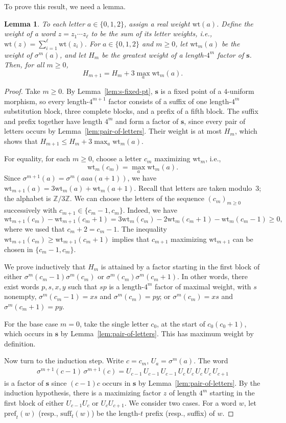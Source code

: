 \documentclass[12pt]{article}
\theoremstyle{plain}
\newtheorem{lemma}[theorem]{Lemma}
\theoremstyle{definition}
\theoremstyle{remark}
\newcommand{\Z}{\mathbb{Z}}
\numberwithin{equation}{section}
\newcommand{\weight}{\mathrm{wt}}
\newcommand{\pref}{\mathrm{pref}}
\newcommand{\suff}{\mathrm{suff}}
\begin{document}
To prove this result, we need a lemma.
\begin{lemma}\label{lem:extrema}
To each letter $a\in\{0,1,2\}$, assign a real weight $\weight(a)$.
Define the weight of a word $z=z_1 \cdots z_\ell$ to be the sum of its letter weights, i.e., $\weight(z) = \sum_{i=1}^\ell \weight(z_i)$.
For $a\in\{0,1,2\}$ and $m\ge 0$, let $\weight_m(a)$ be the weight of $\sigma^m(a)$, and let $H_m$
be the greatest weight of a length-$4^m$ factor of $\mathbf{s}$.
Then, for all $m\ge 0$, 
\[
 H_{m+1}=H_m+3\max_a \weight_m(a).
\]
\end{lemma}
\begin{proof}
Take $m\ge 0$. By Lemma~\ref{lem:s-fixed-pt}, $\mathbf{s}$ is a fixed point of a $4$-uniform morphism, so every length-$4^{m+1}$ factor consists of a suffix
of one length-$4^m$ substitution block, three complete blocks,
and a prefix of a fifth block. The suffix and prefix together
have length $4^m$ and form a factor of $\mathbf{s}$, since every pair of letters occurs by Lemma~\ref{lem:pair-of-letters}.
Their weight is at most $H_m$, which shows that $H_{m+1}\le H_m+3\max_a \weight_m(a)$.

For equality, for each $m\ge 0$, choose a letter $c_m$ maximizing $\weight_m$, i.e., $$\weight_m(c_m) = \max_a \weight_m(a).$$
Since $\sigma^{m+1}(a)=\sigma^m(aaa(a+1))$, we have $\weight_{m+1}(a)=3\weight_m(a)+\weight_m(a+1)$. Recall that letters are taken modulo~$3$; the alphabet is $\Z/3\Z$. We can choose the
letters of the sequence $(c_m)_{m\ge 0}$ successively with $c_{m+1}\in\{c_m-1,c_m\}$. Indeed, we have 
\[
 \weight_{m+1}(c_m)-\weight_{m+1}(c_m+1)
 =3\weight_m(c_m)-2\weight_m(c_m+1)-\weight_m(c_m-1)\ge0,
\]
where we used that $c_m+2=c_m-1$. The inequality $\weight_{m+1}(c_m)\ge \weight_{m+1}(c_m+1)$ implies that $c_{m+1}$ maximizing $\weight_{m+1}$ can be chosen in $\{c_m-1,c_m\}$.

We prove inductively that $H_m$ is attained by a factor
starting in the first block of either
$\sigma^m(c_m-1)\sigma^m(c_m)$ or
$\sigma^m(c_m)\sigma^m(c_m+1)$. In other words, there exist words $p,s,x,y$ such that $sp$ is a length-$4^m$ factor of maximal weight,  with $s$ nonempty, $\sigma^m(c_m-1)=xs$ and $\sigma^m(c_m)=py$; or $\sigma^m(c_m)=xs$ and $\sigma^m(c_m+1)=py$.

For the base case $m=0$, take the single letter $c_0$, at the start of $c_0(c_0+1)$, which occurs in $\mathbf{s}$ by Lemma~\ref{lem:pair-of-letters}. This has maximum weight by definition.

Now turn to the induction step.
Write $c=c_m$, $U_a=\sigma^m(a)$.
The word
\begin{align}
\label{eq:factor-of-len-4N}
 \sigma^{m+1}(c-1)\,\sigma^{m+1}(c)
 =U_{c-1}\,U_{c-1}\,U_{c-1}\,U_c\,U_c\,U_c\,U_c\,U_{c+1}   
\end{align}
is a factor of $\mathbf{s}$ since $(c-1)c$ occurs in $\mathbf{s}$ by Lemma~\ref{lem:pair-of-letters}.
By the induction hypothesis, there is a maximizing factor $z$ of length $4^m$ starting in the first block of either $U_{c-1}U_c$ or $U_cU_{c+1}$.
We consider two cases.
For a word $w$, let $\pref_t(w)$ (resp., $\suff_t (w)$) be the length-$t$ prefix (resp., suffix) of $w$. 


\end{proof}
\end{document}
